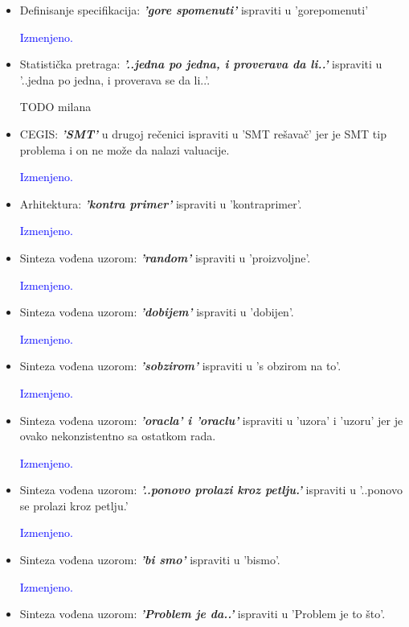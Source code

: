 \documentclass[a4paper]{report}
\newcommand{\odgovor}[1]{\textcolor{blue}{#1}}
\begin{document}
\begin{itemize}
    \item Definisanje specifikacija: \textbf{\textit{'gore spomenuti'}} ispraviti u 'gorepomenuti'

    \odgovor{Izmenjeno.}

    \item Statistička pretraga: \textbf{\textit{'..jedna po jedna, i proverava da li..'}} ispraviti u '..jedna po jedna, i proverava se da li..'.

    TODO milana

    \item CEGIS: \textbf{\textit{'SMT'}} u drugoj rečenici ispraviti u 'SMT rešavač' jer je SMT tip problema i on ne može da nalazi valuacije.

    \odgovor{Izmenjeno.}

    \item Arhitektura: \textbf{\textit{'kontra primer'}} ispraviti u 'kontraprimer'.

	\odgovor{Izmenjeno.}    
    
    \item Sinteza vođena uzorom: \textbf{\textit{'random'}} ispraviti u 'proizvoljne'.

	\odgovor{Izmenjeno.}

    \item Sinteza vođena uzorom: \textbf{\textit{'dobijem'}} ispraviti u 'dobijen'.

	\odgovor{Izmenjeno.}

    \item Sinteza vođena uzorom: \textbf{\textit{'sobzirom'}} ispraviti u 's obzirom na to'.

    \odgovor{Izmenjeno.}

	\item Sinteza vođena uzorom: \textbf{\textit{'oracla' i 'oraclu'}} ispraviti u 'uzora' i 'uzoru' jer je ovako nekonzistentno sa ostatkom rada.

    \odgovor{Izmenjeno.}

    \item Sinteza vođena uzorom: \textbf{\textit{'..ponovo prolazi kroz petlju.'}} ispraviti u '..ponovo se prolazi kroz petlju.'

    \odgovor{Izmenjeno.}

    \item Sinteza vođena uzorom: \textbf{\textit{'bi smo'}} ispraviti u 'bismo'.

    \odgovor{Izmenjeno.}

    \item Sinteza vođena uzorom: \textbf{\textit{'Problem je da..'}} ispraviti u 'Problem je to što'.


\end{itemize}
\end{document}

